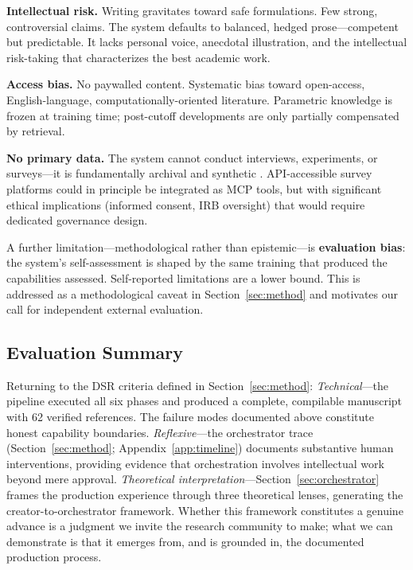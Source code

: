 \documentclass{article}
\begin{document}
\textbf{Intellectual risk.} Writing gravitates toward safe formulations. Few strong, controversial claims. The system defaults to balanced, hedged prose---competent but predictable. It lacks personal voice, anecdotal illustration, and the intellectual risk-taking that characterizes the best academic work.

\textbf{Access bias.} No paywalled content. Systematic bias toward open-access, English-language, computationally-oriented literature. Parametric knowledge is frozen at training time; post-cutoff developments are only partially compensated by retrieval.


\textbf{No primary data.} The system cannot conduct interviews, experiments, or surveys---it is fundamentally archival and synthetic \citep{zheng2025automation}. API-accessible survey platforms could in principle be integrated as MCP tools, but with significant ethical implications (informed consent, IRB oversight) that would require dedicated governance design.

A further limitation---methodological rather than epistemic---is \textbf{evaluation bias}: the system's self-assessment is shaped by the same training that produced the capabilities assessed. Self-reported limitations are a lower bound. This is addressed as a methodological caveat in Section~\ref{sec:method} and motivates our call for independent external evaluation.

\subsection{Evaluation Summary}

Returning to the DSR criteria defined in Section~\ref{sec:method}: \textit{Technical}---the pipeline executed all six phases and produced a complete, compilable manuscript with 62 verified references. The failure modes documented above constitute honest capability boundaries. \textit{Reflexive}---the orchestrator trace (Section~\ref{sec:method}; Appendix~\ref{app:timeline}) documents substantive human interventions, providing evidence that orchestration involves intellectual work beyond mere approval. \textit{Theoretical interpretation}---Section~\ref{sec:orchestrator} frames the production experience through three theoretical lenses, generating the creator-to-orchestrator framework. Whether this framework constitutes a genuine advance is a judgment we invite the research community to make; what we can demonstrate is that it emerges from, and is grounded in, the documented production process.
\end{document}
